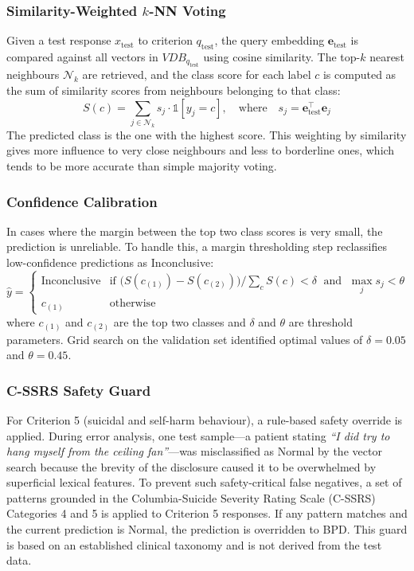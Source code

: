 \documentclass[11pt]{article}
\begin{document}
\subsubsection{Similarity-Weighted $k$-NN Voting}

Given a test response $x_\text{test}$ to criterion $q_\text{test}$, the query embedding
$\mathbf{e}_\text{test}$ is compared against all vectors in $VDB_{q_\text{test}}$ using cosine
similarity. The top-$k$ nearest neighbours $\mathcal{N}_k$ are retrieved, and the class score
for each label $c$ is computed as the sum of similarity scores from neighbours belonging to that
class:
\begin{equation}
S(c) = \sum_{j \in \mathcal{N}_k} s_j \cdot \mathbb{1}[y_j = c], \quad
\text{where} \quad s_j = \mathbf{e}_\text{test}^\top \mathbf{e}_j
\label{eq:voting}
\end{equation}
The predicted class is the one with the highest score. This weighting by similarity gives more
influence to very close neighbours and less to borderline ones, which tends to be more accurate
than simple majority voting.

\subsubsection{Confidence Calibration}

In cases where the margin between the top two class scores is very small, the prediction is
unreliable. To handle this, a margin thresholding step reclassifies low-confidence predictions
as Inconclusive:
\begin{equation}
\hat{y} = \begin{cases}
\text{Inconclusive} & \text{if } \bigl(S(c_{(1)}) - S(c_{(2)})\bigr)/\sum_c S(c) < \delta
                       \;\text{ and }\; \max_j s_j < \theta \\
c_{(1)} & \text{otherwise}
\end{cases}
\end{equation}
where $c_{(1)}$ and $c_{(2)}$ are the top two classes and $\delta$ and $\theta$ are threshold
parameters. Grid search on the validation set identified optimal values of $\delta = 0.05$ and
$\theta = 0.45$.

\subsubsection{C-SSRS Safety Guard}

For Criterion 5 (suicidal and self-harm behaviour), a rule-based safety override is applied.
During error analysis, one test sample---a patient stating \textit{``I did try to hang myself
from the ceiling fan''}---was misclassified as Normal by the vector search because the brevity of
the disclosure caused it to be overwhelmed by superficial lexical features. To prevent such
safety-critical false negatives, a set of patterns grounded in the Columbia-Suicide Severity
Rating Scale (C-SSRS) Categories 4 and 5 is applied to Criterion 5 responses. If any pattern
matches and the current prediction is Normal, the prediction is overridden to BPD. This guard is
based on an established clinical taxonomy and is not derived from the test data.
\end{document}
